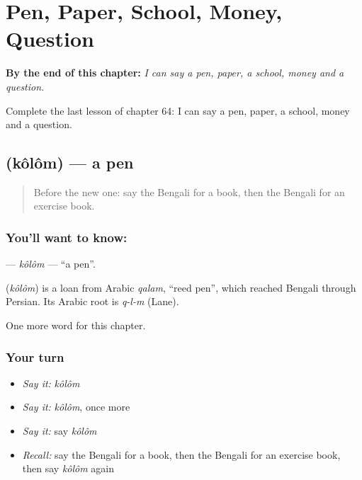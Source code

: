 
\chapter{Pen, Paper, School, Money, Question}
\label{ch:bn-pen-paper-school-money-question}

\begin{chapteropening}
\textbf{By the end of this chapter:} \emph{I can say a pen, paper, a school, money and a question.}

Complete the last lesson of chapter 64: I can say a pen, paper, a school, money and a question.
\end{chapteropening}

\section[\texorpdfstring{\bn{কলম} (kôlôm)}{কলম (kôlôm)}]{ (kôlôm) — a pen}

\label{lesson:BN-C64-kolom}



\begin{quote}
Before the new one: say the Bengali for a book, then the Bengali for an exercise book.
\end{quote}

\subsection*{You'll want to know: }
\textbf{} — \emph{kôlôm} — \textquotedblleft{}a pen\textquotedblright{}.

\begin{cousinweb}
\textbf{} (\emph{kôlôm}) is a loan from Arabic \emph{qalam}, \textquotedblleft{}reed pen\textquotedblright{}, which reached Bengali through Persian. Its Arabic root is \emph{q-l-m} (Lane).
\end{cousinweb}

\begin{grammarlens}[title={What you've built}]
One more word for this chapter.
\end{grammarlens}

\subsection*{Your turn}
\begin{itemize}
\raggedright
  \item \emph{Say it:} \emph{kôlôm}
  \item \emph{Say it:} \emph{kôlôm}, once more
  \item \emph{Say it:} say \emph{kôlôm}
  \item \emph{Recall:} say the Bengali for a book, then the Bengali for an exercise book, then say \emph{kôlôm} again
\end{itemize}

